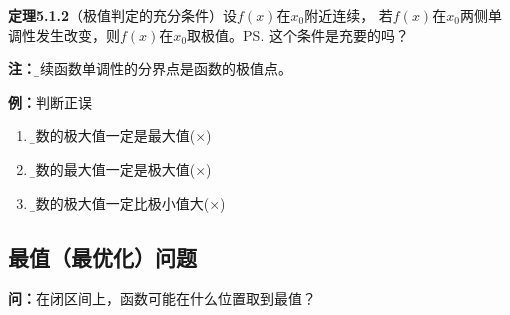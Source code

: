 {\bf 定理5.1.2}（极值判定的充分条件）设$f(x)$在$x_0$附近连续，
若$f(x)$在$x_0$两侧单调性发生改变，则$f(x)$在$x_0$取极值。\ps{这个条件是充要的吗？}

{\bf 注：}{\b 连续函数单调性的分界点是函数的极值点。}

{\bf 例：}判断正误
\begin{enumerate}[(1)]
  \setlength{\itemindent}{1cm}
  \item {\b 函数的极大值一定是最大值\quad  ({$\times$})} 
  \item {\b 函数的最大值一定是极大值\quad  ({$\times$})} 
  \item {\b 函数的极大值一定比极小值大\quad  ({$\times$})} 
\end{enumerate}

\subsection{最值（最优化）问题}

{\bf 问：}在闭区间上，函数可能在什么位置取到最值？


